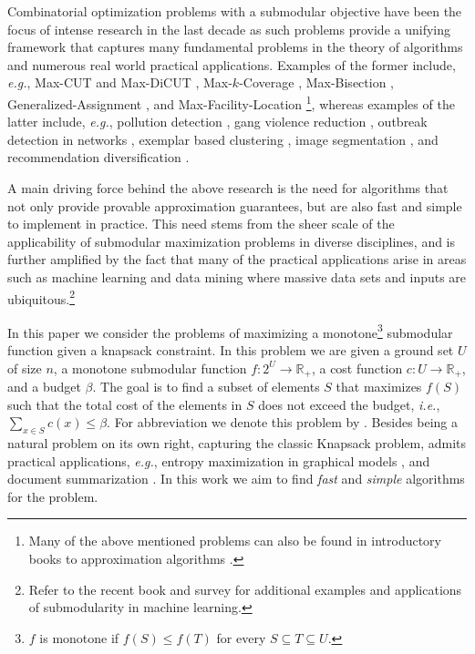 \documentclass[a4paper]{article}
\begin{document}
Combinatorial optimization problems with a submodular objective have been the focus of intense research in the last decade as such problems provide a unifying framework that captures many fundamental problems in the theory of algorithms and numerous real world practical applications.
Examples of the former include, {\em e.g.}, Max-CUT and Max-DiCUT \cite{FG95,GW95,HZ01,H01,K72,KKMO07,LLZ02,TSSW00}, Max-$k$-Coverage \cite{F98,SW11,V01}, Max-Bisection \cite{ABG13,FJ97,HZ02,Y01}, Generalized-Assignment \cite{CK05,CKR06,FGMS06,FV06}, and Max-Facility-Location \cite{AS99,CFN77a,CFN77b}\footnote{Many of the above mentioned problems can also be found in introductory books to approximation algorithms \cite{SW11,V01}.}, whereas examples of the latter include, {\em e.g.}, pollution detection \cite{KLGVF08}, gang violence reduction \cite{SSPB14}, outbreak detection in networks \cite{LKGFFVG07}, exemplar based clustering \cite{GK10}, image segmentation \cite{KXFK11}, and recommendation diversification \cite{YG11}.

A main driving force behind the above research is the need for algorithms that not only provide provable approximation guarantees, but are also fast and  simple to implement in practice.
This need stems from the sheer scale of the applicability of submodular maximization problems in diverse disciplines, and is further amplified by the fact that many of the practical applications arise in areas such as machine learning and data mining where massive data sets and inputs are ubiquitous.\footnote{Refer to the recent book \cite{B13} and survey \cite{KG14} for additional examples and applications of submodularity in machine learning.}



In this paper we consider the problems of maximizing a monotone\footnote{
    $f$ is monotone if $f(S) \leq f(T)$ for every $S \subseteq T \subseteq U$.
} submodular function given a knapsack constraint.
In this problem we are given a ground set
$U$ of size $n$, a monotone submodular function $f:2^U \to \mathbb{R}_+$, a cost function $c:U \to \mathbb{R}_+$, and a budget $\beta$.
The goal is to find a subset of elements $S$ that maximizes $f(S)$ such that the total cost of the elements in $S$ does not exceed the budget, {\em i.e.}, $\sum _{x\in S}c(x)\leq \beta$.
For abbreviation we denote this problem by \SK.
Besides being a natural problem on its own right, capturing the classic Knapsack problem, \SK admits practical applications, {\em e.g.}, entropy maximization in graphical models \cite{krause2005note}, and document summarization \cite{LB10}.
In this work we aim to find {\em fast} and {\em simple} algorithms for the \SK problem.
\end{document}
